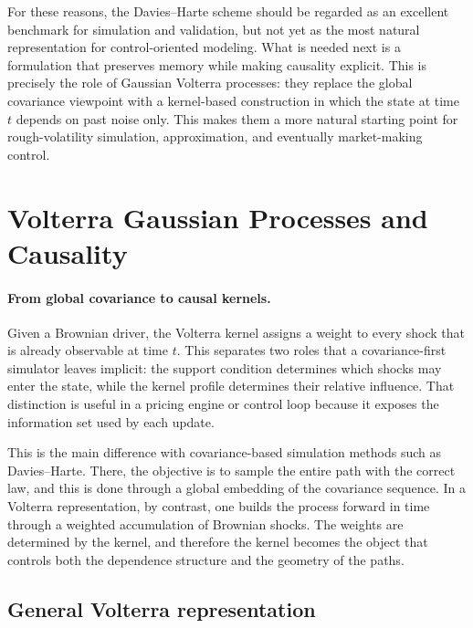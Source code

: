 For these reasons, the Davies--Harte scheme should be regarded as an excellent benchmark for simulation and validation, but not yet as the most natural representation for control-oriented modeling. What is needed next is a formulation that preserves memory while making causality explicit. This is precisely the role of Gaussian Volterra processes: they replace the global covariance viewpoint with a kernel-based construction in which the state at time \(t\) depends on past noise only. This makes them a more natural starting point for rough-volatility simulation, approximation, and eventually market-making control.


\section{Volterra Gaussian Processes and Causality}


\paragraph{From global covariance to causal kernels.}

Given a Brownian driver, the Volterra kernel assigns a weight to every shock that is already observable at time \(t\). This separates two roles that a covariance-first simulator leaves implicit: the support condition determines which shocks may enter the state, while the kernel profile determines their relative influence. That distinction is useful in a pricing engine or control loop because it exposes the information set used by each update.

This is the main difference with covariance-based simulation methods such as Davies--Harte. There, the objective is to sample the entire path with the correct law, and this is done through a global embedding of the covariance sequence. In a Volterra representation, by contrast, one builds the process forward in time through a weighted accumulation of Brownian shocks. The weights are determined by the kernel, and therefore the kernel becomes the object that controls both the dependence structure and the geometry of the paths.

\subsection{General Volterra representation}

